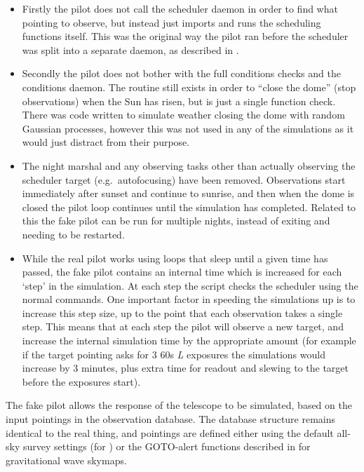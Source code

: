 \begin{colsection}
\begin{colsection}
\begin{itemize}
    \item Firstly the pilot does not call the scheduler daemon in order to find what pointing to observe, but instead just imports and runs the scheduling functions itself. This was the original way the pilot ran before the scheduler was split into a separate daemon, as described in .
    \item Secondly the pilot does not bother with the full conditions checks and the conditions daemon. The  routine still exists in order to ``close the dome'' (stop observations) when the Sun has risen, but is just a single function check. There was code written to simulate weather closing the dome with random Gaussian processes, however this was not used in any of the simulations as it would just distract from their purpose.
    \item The night marshal and any observing tasks other than actually observing the scheduler target (e.g.\ autofocusing) have been removed. Observations start immediately after sunset and continue to sunrise, and then when the dome is closed the pilot loop continues until the simulation has completed. Related to this the fake pilot can be run for multiple nights, instead of exiting and needing to be restarted.
    \item While the real pilot works using loops that sleep until a given time has passed, the fake pilot contains an internal time which is increased for each `step' in the simulation. At each step the script checks the scheduler using the normal commands. One important factor in speeding the simulations up is to increase this step size, up to the point that each observation takes a single step. This means that at each step the pilot will observe a new target, and increase the internal simulation time by the appropriate amount (for example if the target pointing asks for 3 60s \textit{L} exposures the simulations would increase by 3 minutes, plus extra time for readout and slewing to the target before the exposures start).
\end{itemize}

The fake pilot allows the response of the telescope to be simulated, based on the input pointings in the observation database. The database structure remains identical to the real thing, and pointings are defined either using the default all-sky survey settings (for ) or the GOTO-alert functions described in  for gravitational wave skymaps.


\end{colsection}
\end{colsection}

